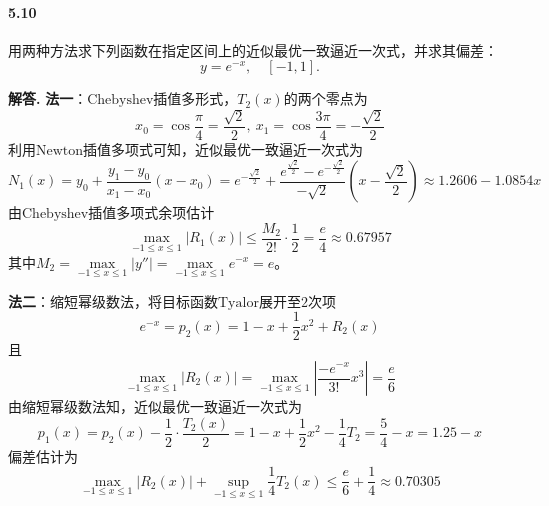 \documentclass[12pt, a4paper, oneside]{ctexart}
\newenvironment{solution}{\par\noindent\textbf{解答. }}{\bigskip\par}
\begin{document}
\paragraph{5.10}用两种方法求下列函数在指定区间上的近似最优一致逼近一次式，并求其偏差：
\begin{equation*}
    y=e^{-x},\quad [-1,1].
\end{equation*}
\begin{solution}
    \textbf{法一}：$\text{Chebyshev}$插值多形式，$T_2(x)$的两个零点为
    \begin{equation*}
        x_0=\cos\dfrac{\pi}{4}=\dfrac{\sqrt{2}}{2},\ x_1=\cos\dfrac{3\pi}{4}=-\frac{\sqrt{2}}{2}
    \end{equation*}
    利用$\text{Newton}$插值多项式可知，近似最优一致逼近一次式为
    \begin{equation*}
        N_1(x) = y_0+\frac{y_1-y_0}{x_1-x_0}(x-x_0)=e^{-\frac{\sqrt{2}}{2}}+\frac{e^{\frac{\sqrt{2}}{2}}-e^{-\frac{\sqrt{2}}{2}}}{-\sqrt{2}}(x-\frac{\sqrt{2}}{2})\approx 1.2606-1.0854x
    \end{equation*}
    由$\text{Chebyshev}$插值多项式余项估计
    \begin{equation*}
        \max_{-1\leqslant x\leqslant 1}|R_1(x)|\leqslant\frac{M_2}{2!}\cdot\frac{1}{2}=\frac{e}{4} \approx 0.67957
    \end{equation*}
    其中$M_2=\max\limits_{-1\leqslant x\leqslant 1}|y''|=\max\limits_{-1\leqslant x\leqslant 1}e^{-x}=e$。
    
    \textbf{法二}：缩短幂级数法，将目标函数$\text{Tyalor}$展开至$2$次项
    \begin{equation*}
        e^{-x}=p_2(x)=1-x+\frac{1}{2}x^2+R_2(x)
    \end{equation*}
    且
    \begin{equation*}
        \max_{-1\leqslant x\leqslant 1}|R_2(x)| = \max_{-1\leqslant x\leqslant 1}\left|\frac{-e^{-x}}{3!}x^3\right|=\frac{e}{6}
    \end{equation*}
    由缩短幂级数法知，近似最优一致逼近一次式为
    \begin{equation*}
        p_1(x) = p_2(x) - \frac{1}{2}\cdot\frac{T_2(x)}{2} = 1-x+\frac{1}{2}x^2-\frac{1}{4}T_2=\frac{5}{4}-x=1.25-x
    \end{equation*}
    偏差估计为
    \begin{equation*}
        \max_{-1\leqslant x\leqslant 1}|R_2(x)|+\sup_{-1\leqslant x\leqslant 1}\frac{1}{4}T_2(x)\leqslant \frac{e}{6}+\frac{1}{4} \approx 0.70305
    \end{equation*}

\end{solution}
\end{document}
